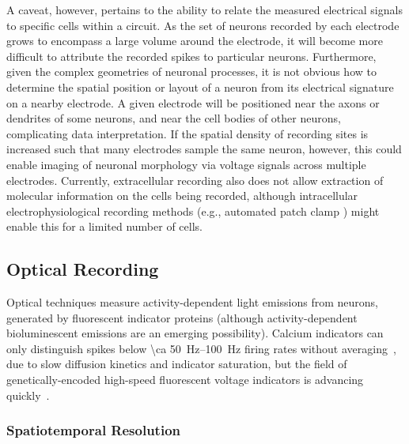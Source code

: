 A caveat, however, pertains to the ability to relate the measured electrical signals to specific cells within a circuit.
As the set of neurons recorded by each electrode grows to encompass a large volume around the electrode, it will become more difficult to attribute the recorded spikes to particular neurons.
Furthermore, given the complex geometries of neuronal processes, it is not obvious how to determine the spatial position or layout of a neuron from its electrical signature on a nearby electrode. A given electrode will be positioned near the axons or dendrites of some neurons, and near the cell bodies of other neurons, complicating data interpretation. If the spatial density of recording sites is increased such that many electrodes sample the same neuron, however, this could enable imaging of neuronal morphology via voltage signals across multiple electrodes. Currently, extracellular recording also does not allow extraction of molecular information on the cells being recorded, although intracellular electrophysiological recording methods (e.g., automated patch clamp \cite{Kodandaramaiah2012}) might enable this for a limited number of cells.

\subsection{Optical Recording}

Optical techniques measure activity-dependent light emissions from neurons, generated by fluorescent indicator proteins (although activity-dependent bioluminescent emissions are an emerging possibility).
Calcium indicators can only distinguish spikes below \SIrange{\ca 50}{100}{\hertz} firing rates without averaging~\cite{Smetters99}, due to slow diffusion kinetics and indicator saturation, but the field of genetically-encoded high-speed fluorescent voltage indicators is advancing quickly~\cite{Barnett2012, Kralj2012, Storace2013, cao2013genetically}.

\subsubsection{Spatiotemporal Resolution}

